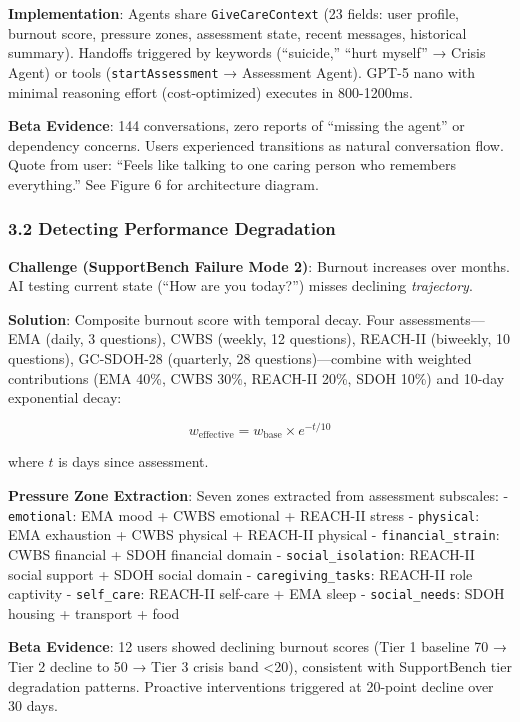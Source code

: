 \documentclass[
]{article}
\begin{document}
\textbf{Implementation}: Agents share \texttt{GiveCareContext} (23
fields: user profile, burnout score, pressure zones, assessment state,
recent messages, historical summary). Handoffs triggered by keywords
(``suicide,'' ``hurt myself'' → Crisis Agent) or tools
(\texttt{startAssessment} → Assessment Agent). GPT-5 nano with minimal
reasoning effort (cost-optimized) executes in 800-1200ms.

\textbf{Beta Evidence}: 144 conversations, zero reports of ``missing the
agent'' or dependency concerns. Users experienced transitions as natural
conversation flow. Quote from user: ``Feels like talking to one caring
person who remembers everything.'' See Figure 6 for architecture
diagram.

\subsubsection{3.2 Detecting Performance
Degradation}\label{detecting-performance-degradation}

\textbf{Challenge (SupportBench Failure Mode 2)}: Burnout increases over
months. AI testing current state (``How are you today?'') misses
declining \emph{trajectory}.

\textbf{Solution}: Composite burnout score with temporal decay. Four
assessments---EMA (daily, 3 questions), CWBS (weekly, 12 questions),
REACH-II (biweekly, 10 questions), GC-SDOH-28 (quarterly, 28
questions)---combine with weighted contributions (EMA 40\%, CWBS 30\%,
REACH-II 20\%, SDOH 10\%) and 10-day exponential decay:

\[w_{\text{effective}} = w_{\text{base}} \times e^{-t / 10}\]

where \(t\) is days since assessment.

\textbf{Pressure Zone Extraction}: Seven zones extracted from assessment
subscales: - \texttt{emotional}: EMA mood + CWBS emotional + REACH-II
stress - \texttt{physical}: EMA exhaustion + CWBS physical + REACH-II
physical - \texttt{financial\_strain}: CWBS financial + SDOH financial
domain - \texttt{social\_isolation}: REACH-II social support + SDOH
social domain - \texttt{caregiving\_tasks}: REACH-II role captivity -
\texttt{self\_care}: REACH-II self-care + EMA sleep -
\texttt{social\_needs}: SDOH housing + transport + food

\textbf{Beta Evidence}: 12 users showed declining burnout scores (Tier 1
baseline 70 → Tier 2 decline to 50 → Tier 3 crisis band \textless20),
consistent with SupportBench tier degradation patterns. Proactive
interventions triggered at 20-point decline over 30 days.
\end{document}
